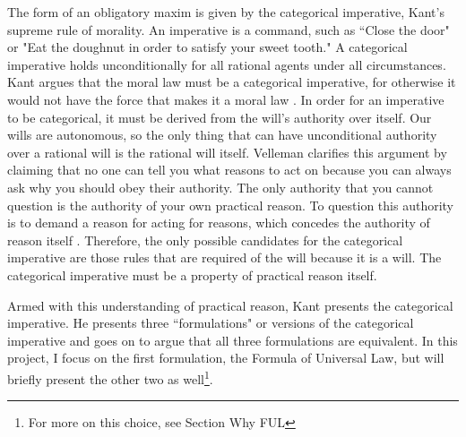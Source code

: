 \begin{isabellebody}
\begin{isamarkuptext}
The form of an obligatory maxim is given by the categorical imperative, Kant's supreme rule of morality. 
An imperative is a command, such as ``Close the door" or "Eat the doughnut in order to satisfy your 
sweet tooth." A categorical imperative holds unconditionally for all rational agents under all 
circumstances. Kant argues that the moral law must be a categorical imperative, for otherwise it would 
not have the force that makes it a moral law \cite[5]{groundwork}. In order for an imperative to be 
categorical, it must be derived from the will's authority over itself. Our wills are autonomous, so 
the only thing that can have unconditional authority over a rational will is 
the rational will itself. Velleman clarifies this argument by claiming that no one can tell you what 
reasons to act on because you can always ask why you 
should obey their authority. The only authority that you cannot question is the authority of your own 
practical reason. To question this authority is to demand a reason for acting for reasons, which 
concedes the authority of reason itself \cite[23]{velleman}. Therefore, the only possible candidates 
for the categorical imperative are those rules that are required of the will because it is a will. 
The categorical imperative must be a property of practical reason itself.

Armed with this understanding of practical reason, Kant presents the categorical 
imperative. He presents three ``formulations" or versions of the categorical imperative and goes on to 
argue that all three formulations are equivalent. In this project, I focus on the first formulation,
the Formula of Universal Law, but will briefly present the other two as well\footnote{For more on this 
choice, see Section Why FUL}. 


\end{isamarkuptext}
\end{isabellebody}

